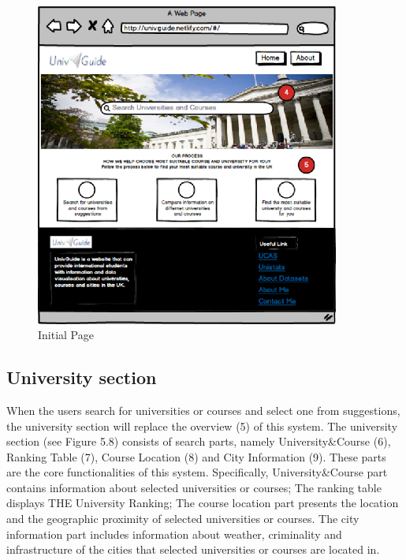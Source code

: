 \begin{figure}[H]
  \centering
  \includegraphics[width=10cm]{./img/Picture13}
  \caption{Initial Page}
  \label{Figure:figex}
\end{figure}


\subsection{University section
}

When the users search for universities or courses and select one from suggestions, the university section will replace the overview (5) of this system. The university section (see Figure 5.8) consists of search parts, namely University\&Course (6), Ranking Table (7), Course Location (8) and City Information (9). These parts are the core functionalities of this system. Specifically, University\&Course part contains information about selected universities or courses; The ranking table displays THE University Ranking; The course location part presents the location and the geographic proximity of selected universities or courses. The city information part includes information about weather, criminality and infrastructure of the cities that selected universities or courses are located in.



